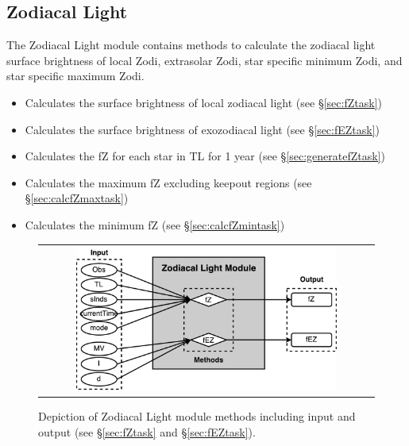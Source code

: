 \documentclass[cleanfoot]{asme2ej}
\newcommand{\reffig}[1]{Figure \ref{#1}}
\begin{document}
\subsection{Zodiacal Light}\label{sec:zodiacallight}
The Zodiacal Light module contains methods to calculate the zodiacal light surface brightness of local Zodi, extrasolar Zodi, star specific minimum Zodi, and star specific maximum Zodi.
\begin{itemize}[leftmargin=1in,font={\ttfamily}]
    \item[\texttt fZ] Calculates the surface brightness of local zodiacal light  (see \S\ref{sec:fZtask})
    \item[\texttt fEZ] Calculates the surface brightness of exozodiacal light (see \S\ref{sec:fEZtask})
    \item[\texttt generate\_fZ] Calculates the fZ for each star in TL for 1 year (see \S\ref{sec:generatefZtask})
    \item[\texttt calcfZmax] Calculates the maximum fZ excluding keepout regions (see \S\ref{sec:calcfZmaxtask})
    \item[\texttt calcfZmin] Calculates the minimum fZ (see \S\ref{sec:calcfZmintask})
\end{itemize}

\begin{figure}[ht]
    \begin{center}
        \begin{tabular}{c}
             \includegraphics[width=0.8\textwidth]{ZodiTasks2}
        \end{tabular}
    \end{center}
    \caption{\label{fig:zodiacallightmodule} Depiction of Zodiacal Light module methods including input and output (see \S\ref{sec:fZtask} and \S\ref{sec:fEZtask}).}
\end{figure}
\end{document}
